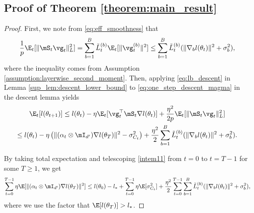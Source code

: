 \documentclass[11pt, a4paper, twocolumn, copyright, goog]{google}
\theoremstyle{plain}
\theoremstyle{definition}
\theoremstyle{remark}
\begin{document}
\subsection{Proof of Theorem \ref{theorem:main_result}}
\begin{proof}
    First, we note from \eqref{eq:eff_smoothness} that  
    \begin{equation}
        \frac{1}{p} \E_t [\| \mS_t \vg_t \|^2_L] = \sum_{b=1}^{B} \tilde{L}_{t}^{(b)} \E_t[\| \vg_t^{(b)} \|^2] \le \sum_{b=1}^{B} \tilde{L}_{t}^{(b)} (\|\nabla_b l(\theta_t) \|^2  + \sigma_b^2), 
    \end{equation}
    where the inequality comes from Assumption \ref{assumption:layerwise_second_moment}.
    Then, applying \eqref{eq:lb_descent} in Lemma \ref{sup_lem:descent_lower_bound} to \eqref{eq:one_step_descent_magma} in the descent lemma yields
    \begin{multline} \label{intem11}
        \E_t[l(\theta_{t+1})] 
            \leq l(\theta_t) - \eta \E_t [\vg_t^\top \mS_t  \nabla l(\theta_t)] + \frac{\eta^2}{2p} \E_t [\| \mS_t \vg_t \|_L^2 ] \\
                \leq l(\theta_t) - \eta \left( \| (\alpha_t \otimes \mI_{d'}) \nabla l (\theta_T) \|^2 - \sigma^2_{C_t} \right) + \frac{\eta^2}{2} \sum_{b=1}^{B} \tilde{L}_{t}^{(b)} (\|\nabla_b l(\theta_t) \|^2  + \sigma_b^2).
    \end{multline}
    
    By taking total expectation and telescoping \eqref{intem11} from $t=0$ to $t = T-1$ for some $T \ge 1$, we get
    \begin{equation}
        \sum_{t=0}^{T-1} \eta \E [ \| (\alpha_t \otimes \mI_{d'}) \nabla l (\theta_T) \|^2 ] 
        \le l(\theta_0) - l_* 
            + \sum_{t=0}^{T-1} \eta \E[\sigma^2_{C_t}] 
            + \frac{\eta^2}{2} \sum_{t=0}^{T-1} \sum_{b=1}^{B} \tilde{L}_{t}^{(b)} (\|\nabla_b l(\theta_t) \|^2  + \sigma_b^2),
    \end{equation}
    where we use the factor that $\E [l(\theta_T)] > l_*$.
    

\end{proof}
\end{document}
